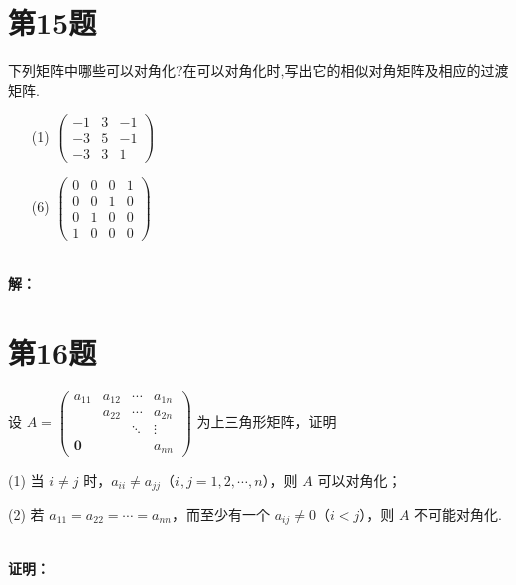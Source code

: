 \documentclass[a4paper, 12pt]{ctexart}
\begin{document}
\section{第15题}
\begin{exercise}
下列矩阵中哪些可以对角化?在可以对角化时,写出它的相似对角矩阵及相应的过渡矩阵.
\begin{enumerate}
    \item[(1)] $\left(\begin{array}{ccc}-1 & 3 & -1 \\ -3 & 5 & -1 \\ -3 & 3 & 1\end{array}\right)$
    \item[(6)] $\left(\begin{array}{cccc}0 & 0 & 0 & 1 \\ 0 & 0 & 1 & 0 \\ 0 & 1 & 0 & 0 \\ 1 & 0 & 0 & 0\end{array}\right)$
\end{enumerate}
\end{exercise}~\\
\noindent\textbf{解：}

\section{第16题}
\begin{exercise}
设 $A = \begin{pmatrix}
a_{11} & a_{12} & \cdots & a_{1n} \\
       & a_{22} & \cdots & a_{2n} \\
       &        & \ddots & \vdots \\
\mathbf{0} & & & a_{nn}
\end{pmatrix}$ 为上三角形矩阵，证明

(1) 当 $i \neq j$ 时，$a_{ii} \neq a_{jj}$（$i,j = 1,2,\cdots,n$），则 $A$ 可以对角化；

(2) 若 $a_{11} = a_{22} = \cdots = a_{nn}$，而至少有一个 $a_{ij} \neq 0$（$i < j$），则 $A$ 不可能对角化.
\end{exercise}~\\
\noindent\textbf{证明：}
\end{document}
